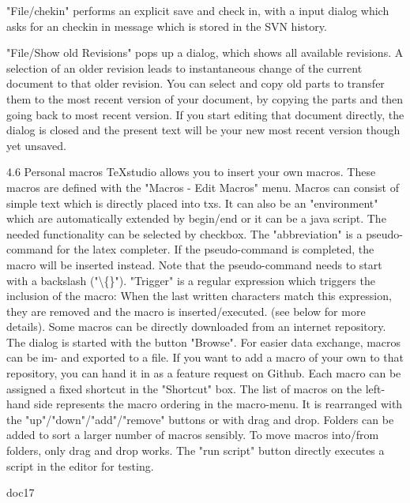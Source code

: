 \documentclass{article}
\begin{document}
	"File/chekin" performs an explicit save and check in, with a input dialog which asks for an checkin in message which is stored in the SVN history.
	
	"File/Show old Revisions" pops up a dialog, which shows all available revisions. A selection of an older revision leads to instantaneous change of the current document to that older revision. You can select and copy old parts to transfer them to the most recent version of your document, by copying the parts and then going back to most recent version. If you start editing that document directly, the dialog is closed and the present text will be your new most recent version though yet unsaved.
	
	4.6 Personal macros
	TeXstudio allows you to insert your own macros. These macros are defined with the "Macros - Edit Macros" menu. Macros can consist of simple text which is directly placed into txs. It can also be an "environment" which are automatically extended by begin/end or it can be a java script. The needed functionality can be selected by checkbox.
	The "abbreviation" is a pseudo-command for the latex completer. If the pseudo-command is completed, the macro will be inserted instead. Note that the pseudo-command needs to start with a backslash ("\textbackslash\{\}").
	"Trigger" is a regular expression which triggers the inclusion of the macro: When the last written characters match this expression, they are removed and the macro is inserted/executed. (see below for more details).
	Some macros can be directly downloaded from an internet repository. The dialog is started with the button "Browse". For easier data exchange, macros can be im- and exported to a file. If you want to add a macro of your own to that repository, you can hand it in as a feature request on Github.
	Each macro can be assigned a fixed shortcut in the "Shortcut" box.
	The list of macros on the left-hand side represents the macro ordering in the macro-menu. It is rearranged with the "up"/"down"/"add"/"remove" buttons or with drag and drop. Folders can be added to sort a larger number of macros sensibly. To move macros into/from folders, only drag and drop works.
	The "run script" button directly executes a script in the editor for testing.
	
	doc17
	
\end{document}

